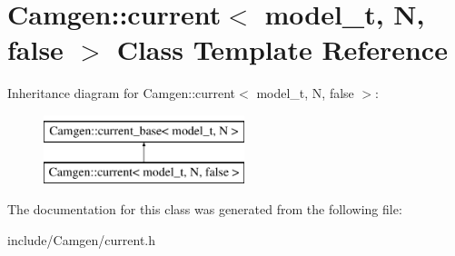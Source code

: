 \hypertarget{a00107}{}\section{Camgen\+:\+:current$<$ model\+\_\+t, N, false $>$ Class Template Reference}
\label{a00107}
Inheritance diagram for Camgen\+:\+:current$<$ model\+\_\+t, N, false $>$\+:\begin{figure}[H]
\begin{center}
\leavevmode
\includegraphics[height=2.000000cm]{a00107}
\end{center}
\end{figure}


The documentation for this class was generated from the following file\+:\begin{DoxyCompactItemize}
\item 
include/\+Camgen/current.\+h\end{DoxyCompactItemize}

